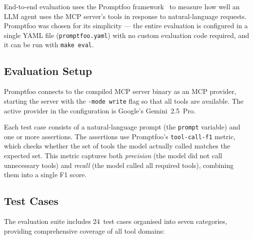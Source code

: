 \documentclass[
  digital,     %
  oneside,     %
  nosansbold,  %
  nocolorbold, %
  lof,         %
  lot,         %
]{fithesis4}
\begin{document}
End-to-end evaluation uses the Promptfoo framework~\parencite{promptfoo} to
measure how well an LLM agent uses the MCP server's tools in response to
natural-language requests. Promptfoo was chosen for its simplicity --- the
entire evaluation is configured in a single YAML file (\texttt{promptfoo.yaml})
with no custom evaluation code required, and it can be run with
\texttt{make eval}.

\subsection{Evaluation Setup}
\label{subsec:eval-setup}

Promptfoo connects to the compiled MCP server binary as an MCP provider,
starting the server with the \texttt{-mode write} flag so that all tools
are available. The active provider in the configuration is Google's
Gemini~2.5~Pro.

Each test case consists of a natural-language prompt (the \texttt{prompt}
variable) and one or more assertions. The assertions use Promptfoo's
\texttt{tool-call-f1} metric, which checks whether the set of tools the
model actually called matches the expected set. This metric captures both
\emph{precision} (the model did not call unnecessary tools) and
\emph{recall} (the model called all required tools), combining them into
a single F1 score.

\subsection{Test Cases}
\label{subsec:eval-cases}

The evaluation suite includes 24~test cases organised into seven categories,
providing comprehensive coverage of all tool domains:
\end{document}
